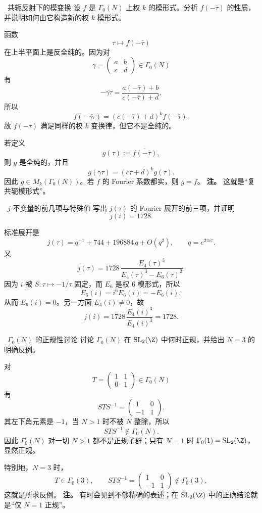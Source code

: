 \begin{problem}{\easy\ 共轭反射下的模变换}
设 $f$ 是 $\Gamma_0(N)$ 上权 $k$ 的模形式。分析 $f(-\bar\tau)$ 的性质，并说明如何由它构造新的权 $k$ 模形式。
\end{problem}
\begin{solution}
函数
\[
\tau\longmapsto f(-\bar\tau)
\]
在上半平面上是反全纯的。因为对
\[
\gamma=\begin{pmatrix}a&b\\c&d\end{pmatrix}\in \Gamma_0(N)
\]
有
\[
-\overline{\gamma\tau}
=\frac{a(-\bar\tau)+b}{c(-\bar\tau)+d},
\]
所以
\[
f(-\overline{\gamma\tau})
=(c(-\bar\tau)+d)^k f(-\bar\tau).
\]
故 $f(-\bar\tau)$ 满足同样的权 $k$ 变换律，但它不是全纯的。

若定义
\[
g(\tau):=\overline{f(-\bar\tau)},
\]
则 $g$ 是全纯的，并且
\[
g(\gamma\tau)=(c\tau+d)^k g(\tau).
\]
因此 $g\in M_k(\Gamma_0(N))$。若 $f$ 的 Fourier 系数都实，则 $g=f$。 \textbf{注。} 这就是“复共轭模形式”。
\end{solution}

\begin{problem}{\easy\ $j$-不变量的前几项与特殊值}
写出 $j(\tau)$ 的 Fourier 展开的前三项，并证明
\[
j(i)=1728.
\]
\end{problem}
\begin{solution}
标准展开是
\[
j(\tau)=q^{-1}+744+196884\,q+O(q^2),\qquad q=e^{2\pi i\tau}.
\]
又
\[
j(\tau)=1728\,\frac{E_4(\tau)^3}{E_4(\tau)^3-E_6(\tau)^2}.
\]
因为 $i$ 被 $S:\tau\mapsto -1/\tau$ 固定，而 $E_6$ 是权 $6$ 模形式，所以
\[
E_6(i)=i^6E_6(i)=-E_6(i),
\]
从而 $E_6(i)=0$。另一方面 $E_4(i)\neq0$，故
\[
j(i)=1728\,\frac{E_4(i)^3}{E_4(i)^3}=1728.
\]
\end{solution}

\begin{problem}{\easy\ $\Gamma_0(N)$ 的正规性讨论}
讨论 $\Gamma_0(N)$ 在 $\mathrm{SL}_2(\Z)$ 中何时正规，并给出 $N=3$ 的明确反例。
\end{problem}
\begin{solution}
对
\[
T=\begin{pmatrix}1&1\\0&1\end{pmatrix}\in \Gamma_0(N)
\]
有
\[
STS^{-1}
=\begin{pmatrix}1&0\\-1&1\end{pmatrix}.
\]
其左下角元素是 $-1$，当 $N>1$ 时不被 $N$ 整除，所以
\[
STS^{-1}\notin \Gamma_0(N).
\]
因此 $\Gamma_0(N)$ 对一切 $N>1$ 都不是正规子群；只有 $N=1$ 时 $\Gamma_0(1)=\mathrm{SL}_2(\Z)$，显然正规。

特别地，$N=3$ 时，
\[
T\in \Gamma_0(3),\qquad
STS^{-1}=\begin{pmatrix}1&0\\-1&1\end{pmatrix}\notin \Gamma_0(3),
\]
这就是所求反例。 \textbf{注。} 有时会见到不够精确的表述；在 $\mathrm{SL}_2(\Z)$ 中的正确结论就是“仅 $N=1$ 正规”。
\end{solution}

